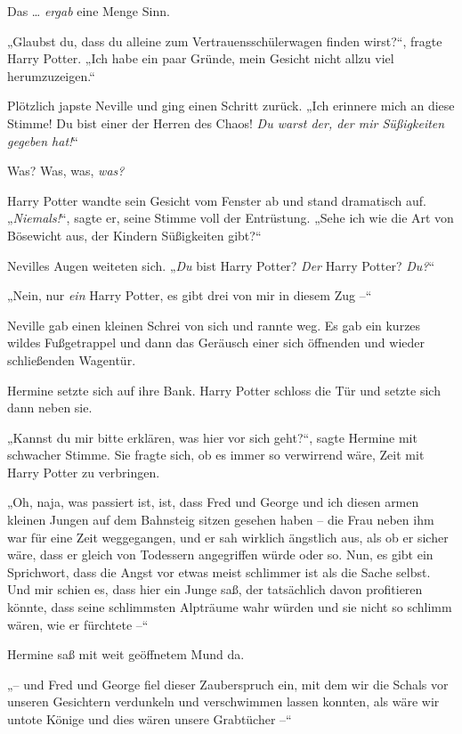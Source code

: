{Das … \emph{ergab} eine Menge Sinn.

„Glaubst du, dass du alleine zum Vertrauensschülerwagen finden wirst?“, fragte Harry Potter. „Ich habe ein paar Gründe, mein Gesicht nicht allzu viel herumzuzeigen.“

Plötzlich japste Neville und ging einen Schritt zurück. „Ich erinnere mich an diese Stimme! Du bist einer der Herren des Chaos! \emph{Du warst der, der mir Süßigkeiten gegeben hat!}“

Was? Was, was, \emph{was?}

Harry Potter wandte sein Gesicht vom Fenster ab und stand dramatisch auf. „\emph{Niemals!}“, sagte er, seine Stimme voll der Entrüstung. „Sehe ich wie die Art von Bösewicht aus, der Kindern Süßigkeiten gibt?“

Nevilles Augen weiteten sich. „\emph{Du} bist Harry Potter? \emph{Der} Harry Potter? \emph{Du?}“

„Nein, nur \emph{ein} Harry Potter, es gibt drei von mir in diesem Zug --“

Neville gab einen kleinen Schrei von sich und rannte weg. Es gab ein kurzes wildes Fußgetrappel und dann das Geräusch einer sich öffnenden und wieder schließenden Wagentür.

Hermine setzte sich auf ihre Bank. Harry Potter schloss die Tür und setzte sich dann neben sie.

„Kannst du mir bitte erklären, was hier vor sich geht?“, sagte Hermine mit schwacher Stimme. Sie fragte sich, ob es immer so verwirrend wäre, Zeit mit Harry Potter zu verbringen.

„Oh, naja, was passiert ist, ist, dass Fred und George und ich diesen armen kleinen Jungen auf dem Bahnsteig sitzen gesehen haben -- die Frau neben ihm war für eine Zeit weggegangen, und er sah wirklich ängstlich aus, als ob er sicher wäre, dass er gleich von Todessern angegriffen würde oder so. Nun, es gibt ein Sprichwort, dass die Angst vor etwas meist schlimmer ist als die Sache selbst. Und mir schien es, dass hier ein Junge saß, der tatsächlich davon profitieren könnte, dass seine schlimmsten Alpträume wahr würden und sie nicht so schlimm wären, wie er fürchtete --“

Hermine saß mit weit geöffnetem Mund da.

„-- und Fred und George fiel dieser Zauberspruch ein, mit dem wir die Schals vor unseren Gesichtern verdunkeln und verschwimmen lassen konnten, als wäre wir untote Könige und dies wären unsere Grabtücher --“

}
